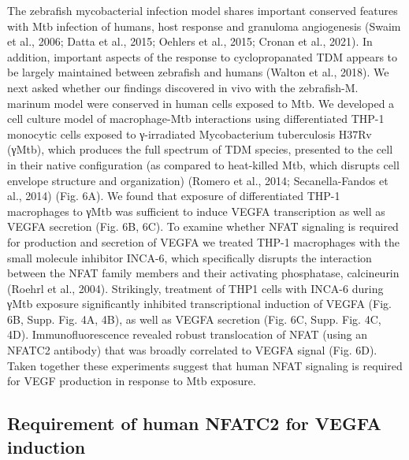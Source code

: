 The zebrafish mycobacterial infection model shares important conserved features with Mtb infection of humans, host response and granuloma angiogenesis (Swaim et al., 2006; Datta et al., 2015; Oehlers et al., 2015; Cronan et al., 2021). In addition, important aspects of the response to cyclopropanated TDM appears to be largely maintained between zebrafish and humans (Walton et al., 2018). We next asked whether our findings discovered in vivo with the zebrafish-M. marinum model were conserved in human cells exposed to Mtb. We developed a cell culture model of macrophage-Mtb interactions using differentiated THP-1 monocytic cells exposed to γ-irradiated Mycobacterium tuberculosis H37Rv (γMtb), which produces the full spectrum of TDM species, presented to the cell in their native configuration (as compared to heat-killed Mtb, which disrupts cell envelope structure and organization) (Romero et al., 2014; Secanella-Fandos et al., 2014) (Fig. 6A). We found that exposure of differentiated THP-1 macrophages to γMtb was sufficient to induce VEGFA transcription as well as VEGFA secretion (Fig. 6B, 6C). To examine whether NFAT signaling is required for production and secretion of VEGFA we treated THP-1 macrophages with the small molecule inhibitor INCA-6, which specifically disrupts the interaction between the NFAT family members and their activating phosphatase, calcineurin (Roehrl et al., 2004). Strikingly, treatment of THP1 cells with INCA-6 during γMtb exposure significantly inhibited transcriptional induction of VEGFA (Fig. 6B, Supp. Fig. 4A, 4B), as well as VEGFA secretion (Fig. 6C, Supp. Fig. 4C, 4D). Immunofluorescence revealed robust translocation of NFAT (using an NFATC2 antibody) that was broadly correlated to VEGFA signal (Fig. 6D). Taken together these experiments suggest that human NFAT signaling is required for VEGF production in response to Mtb exposure.

\subsection{Requirement of human NFATC2 for VEGFA induction}

